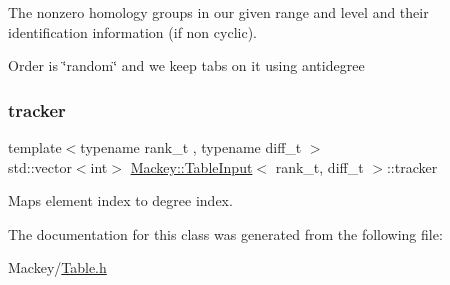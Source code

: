 The nonzero homology groups in our given range and level and their identification information (if non cyclic). 

Order is \char`\"{}random\char`\"{} and we keep tabs on it using antidegree \mbox{\label{classMackey_1_1TableInput_a33fcb835c85458360bb78cf07555fb60}} 
\subsubsection{\texorpdfstring{tracker}{tracker}}
{\footnotesize\ttfamily template$<$typename rank\+\_\+t , typename diff\+\_\+t $>$ \\
std\+::vector$<$int$>$ \hyperlink{classMackey_1_1TableInput}{Mackey\+::\+Table\+Input}$<$ rank\+\_\+t, diff\+\_\+t $>$\+::tracker\hspace{0.3cm}{\ttfamily [protected]}}



Maps element index to degree index. 



The documentation for this class was generated from the following file\+:\begin{DoxyCompactItemize}
\item 
Mackey/\hyperlink{Table_8h}{Table.\+h}\end{DoxyCompactItemize}
